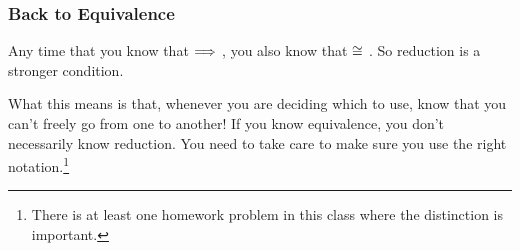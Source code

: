 \documentclass[aspectratio=169]{beamer}
\begin{document}






\begin{frame}[fragile]
  \frametitle{Back to Equivalence}

  Any time that you know that  $\Longrightarrow$ , you also
  know that  $\cong$ . So reduction is a stronger
  condition.

  \pause
  \vspace{\fill}

  What this means is that, whenever you are deciding which to use, know
  that you can't freely go from one to another! If you know equivalence,
  you don't necessarily know reduction. You need to take care to make sure
  you use the right notation.\footnote{There is at least one homework problem in this class
  where the distinction is important.}

\end{frame}
\end{document}
